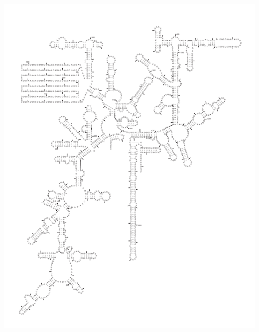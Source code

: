 \begin{center}
\newpage
\includegraphics[height=8.5in]{../../seeds/ss-diagrams/eukarya-0p1}


\end{center}
